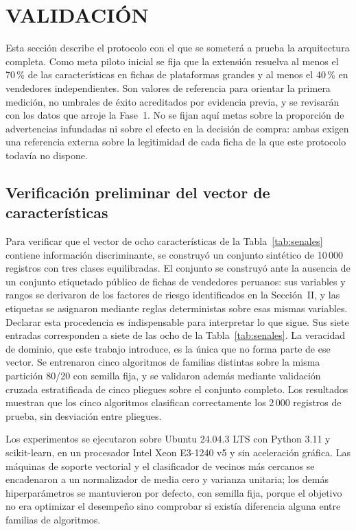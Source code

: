
\section{VALIDACIÓN}

Esta sección describe el protocolo con el que se someterá a prueba la arquitectura completa.
Como meta piloto inicial se fija que la extensión resuelva al menos el 70\,\% de las
características en fichas de plataformas grandes y al menos el 40\,\% en vendedores
independientes. Son valores de referencia para orientar la primera medición, no umbrales de
éxito acreditados por evidencia previa, y se revisarán con los datos que arroje la Fase~1. No
se fijan aquí metas sobre la proporción de advertencias infundadas ni sobre el efecto en la
decisión de compra: ambas exigen una referencia externa sobre la legitimidad de cada ficha de
la que este protocolo todavía no dispone.

\subsection{Verificación preliminar del vector de características}

Para verificar que el vector de ocho características de la Tabla~\ref{tab:senales} contiene
información discriminante, se construyó un conjunto sintético de 10\,000 registros con tres
clases equilibradas. El conjunto se construyó ante la ausencia de un conjunto etiquetado
público de fichas de vendedores peruanos: sus variables y rangos se derivaron de los factores
de riesgo identificados en la Sección~II, y las etiquetas se asignaron mediante reglas
deterministas sobre esas mismas variables. Declarar esta procedencia es indispensable para
interpretar lo que sigue. Sus siete entradas corresponden a siete de las ocho de la
Tabla~\ref{tab:senales}. La veracidad de dominio, que este trabajo introduce, es la única que
no forma parte de ese vector. Se entrenaron cinco algoritmos de familias distintas sobre la
misma partición 80/20 con semilla fija, y se validaron además mediante validación cruzada
estratificada de cinco pliegues sobre el conjunto completo. Los resultados muestran que los
cinco algoritmos clasifican correctamente los 2\,000 registros de prueba, sin desviación
entre pliegues.

Los experimentos se ejecutaron sobre Ubuntu 24.04.3 LTS con Python 3.11 y scikit-learn, en un
procesador Intel Xeon E3-1240 v5 y sin aceleración gráfica. Las máquinas de soporte vectorial y
el clasificador de vecinos más cercanos se encadenaron a un normalizador de media cero y
varianza unitaria; los demás hiperparámetros se mantuvieron por defecto, con semilla fija,
porque el objetivo no era optimizar el desempeño sino comprobar si existía diferencia alguna
entre familias de algoritmos.

